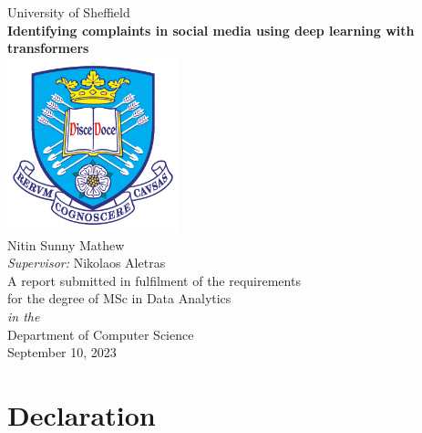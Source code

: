 \documentclass[11pt,oneside]{book}
\begin{document}
\frontmatter

\begin{titlepage}


    \begin{center}
        {\LARGE University of Sheffield}\\[1.5cm]
        \linespread{1.2}\huge {\bfseries Identifying complaints in social media using deep learning with transformers}\\[1.5cm]
        \linespread{1}
        \includegraphics[width=5cm]{images/tuoslogo.png}\\[1cm]
        {\Large Nitin Sunny Mathew}\\[1cm]
        {\large \emph{Supervisor:} Nikolaos Aletras}\\[1cm]
        \large A report submitted in fulfilment of the requirements\\ for the degree of MSc in Data Analytics\\[0.3cm]
        \textit{in the}\\[0.3cm]
        Department of Computer Science\\[2cm]
        September 10, 2023\\
    \end{center}

\end{titlepage}


\newpage
\chapter*{\Large Declaration}

\end{document}
